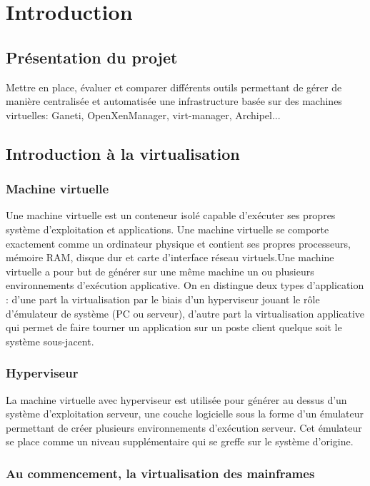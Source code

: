 \chapter{Introduction}
\section{Présentation du projet}
Mettre en place, évaluer et comparer différents outils permettant de gérer de manière
centralisée et automatisée une infrastructure basée sur des machines virtuelles: Ganeti,
OpenXenManager, virt-manager, Archipel...
\section{Introduction à la virtualisation}
\subsection{Machine virtuelle}


Une machine virtuelle est un conteneur isolé capable d'exécuter
ses propres système d'exploitation et applications.
Une machine virtuelle se comporte exactement comme un ordinateur physique
et contient ses propres processeurs, mémoire RAM, disque dur et carte
d'interface réseau virtuels.Une machine virtuelle
a pour but de générer sur une même machine un ou plusieurs environnements
d'exécution applicative. On en distingue deux types d'application
: d'une part la virtualisation par le biais d'un hyperviseur jouant
le rôle d'émulateur de système (PC ou serveur), d'autre part la virtualisation
applicative qui permet de faire tourner un application sur un poste
client quelque soit le système sous-jacent.

\subsection{Hyperviseur }


La machine virtuelle avec hyperviseur est utilisée pour générer au
dessus d'un système d'exploitation serveur, une couche logicielle sous
la forme d'un émulateur permettant de créer plusieurs environnements
d'exécution serveur. Cet émulateur se place comme un niveau supplémentaire qui se greffe sur le système d'origine.
\newpage
\subsection{Au commencement, la virtualisation des mainframes}

